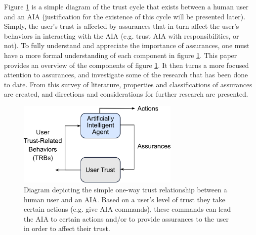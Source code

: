     Figure \ref{fig:SimpleTrust_one_way} is a simple diagram of the trust cycle that exists between a human user and an AIA (justification for the existence of this cycle will be presented later). Simply, the user's trust is affected by assurances that in turn affect the user's behaviors in interacting with the AIA (e.g. trust AIA with responsibilities, or not). To fully understand and appreciate the importance of assurances, one must have a more formal understanding of each component in figure \ref{fig:SimpleTrust_one_way}. %
This paper provides an overview of the components of figure \ref{fig:SimpleTrust_one_way}. It then turns a more focused attention to assurances, and investigate some of the research that has been done to date. From this survey of literature, properties and classifications of assurances are created, and directions and considerations for further research are presented.

    \begin{figure}
        \centering
        \includegraphics[width=0.7\textwidth]{Figures/SimpleTrust_one_way.png}
        \caption{Diagram depicting the simple one-way trust relationship between a human user and an AIA. Based on a user's level of trust they take certain actions (e.g. give AIA commands), these commands can lead the AIA to certain actions and/or to provide assurances to the user in order to affect their trust.}
        \label{fig:SimpleTrust_one_way}
    \end{figure}

